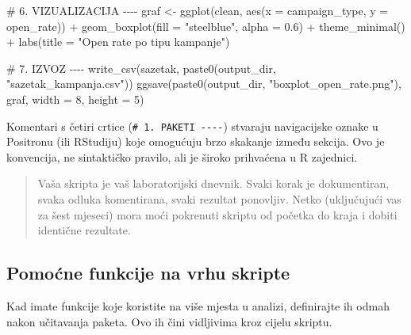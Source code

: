 \documentclass[
  croatian,
  letterpaper,
  DIV=11,
  numbers=noendperiod]{scrartcl}
\newenvironment{Shaded}{\begin{snugshade}}{\end{snugshade}}
\newcommand{\AttributeTok}[1]{\textcolor[rgb]{0.40,0.45,0.13}{#1}}
\newcommand{\CommentTok}[1]{\textcolor[rgb]{0.37,0.37,0.37}{#1}}
\newcommand{\DecValTok}[1]{\textcolor[rgb]{0.68,0.00,0.00}{#1}}
\newcommand{\FloatTok}[1]{\textcolor[rgb]{0.68,0.00,0.00}{#1}}
\newcommand{\FunctionTok}[1]{\textcolor[rgb]{0.28,0.35,0.67}{#1}}
\newcommand{\NormalTok}[1]{\textcolor[rgb]{0.00,0.23,0.31}{#1}}
\newcommand{\OtherTok}[1]{\textcolor[rgb]{0.00,0.23,0.31}{#1}}
\newcommand{\SpecialCharTok}[1]{\textcolor[rgb]{0.37,0.37,0.37}{#1}}
\newcommand{\StringTok}[1]{\textcolor[rgb]{0.13,0.47,0.30}{#1}}
\begin{document}
\begin{Shaded}
\begin{Highlighting}[]
\CommentTok{\# 6. VIZUALIZACIJA {-}{-}{-}{-}}
\NormalTok{graf }\OtherTok{\textless{}{-}} \FunctionTok{ggplot}\NormalTok{(clean, }\FunctionTok{aes}\NormalTok{(}\AttributeTok{x =}\NormalTok{ campaign\_type, }\AttributeTok{y =}\NormalTok{ open\_rate)) }\SpecialCharTok{+}
  \FunctionTok{geom\_boxplot}\NormalTok{(}\AttributeTok{fill =} \StringTok{"steelblue"}\NormalTok{, }\AttributeTok{alpha =} \FloatTok{0.6}\NormalTok{) }\SpecialCharTok{+}
  \FunctionTok{theme\_minimal}\NormalTok{() }\SpecialCharTok{+}
  \FunctionTok{labs}\NormalTok{(}\AttributeTok{title =} \StringTok{"Open rate po tipu kampanje"}\NormalTok{)}

\CommentTok{\# 7. IZVOZ {-}{-}{-}{-}}
\FunctionTok{write\_csv}\NormalTok{(sazetak, }\FunctionTok{paste0}\NormalTok{(output\_dir, }\StringTok{"sazetak\_kampanja.csv"}\NormalTok{))}
\FunctionTok{ggsave}\NormalTok{(}\FunctionTok{paste0}\NormalTok{(output\_dir, }\StringTok{"boxplot\_open\_rate.png"}\NormalTok{), graf, }\AttributeTok{width =} \DecValTok{8}\NormalTok{, }\AttributeTok{height =} \DecValTok{5}\NormalTok{)}
\end{Highlighting}
\end{Shaded}

Komentari s četiri crtice (\texttt{\#\ 1.\ PAKETI\ -\/-\/-\/-}) stvaraju
navigacijske oznake u Positronu (ili RStudiju) koje omogućuju brzo
skakanje između sekcija. Ovo je konvencija, ne sintaktičko pravilo, ali
je široko prihvaćena u R zajednici.

\begin{quote}
Vaša skripta je vaš laboratorijski dnevnik. Svaki korak je dokumentiran,
svaka odluka komentirana, svaki rezultat ponovljiv. Netko (uključujući
vas za šest mjeseci) mora moći pokrenuti skriptu od početka do kraja i
dobiti identične rezultate.
\end{quote}

\subsection{Pomoćne funkcije na vrhu
skripte}\label{pomoux107ne-funkcije-na-vrhu-skripte}

Kad imate funkcije koje koristite na više mjesta u analizi, definirajte
ih odmah nakon učitavanja paketa. Ovo ih čini vidljivima kroz cijelu
skriptu.
\end{document}
